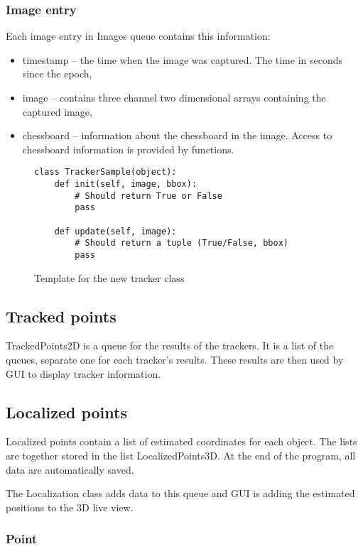 \subsubsection*{Image entry}

Each image entry in Images queue contains this information: 
\begin{itemize}
\item timestamp -- the time when the image was captured. The time in seconds
since the epoch, \item image -- contains three channel two dimensional arrays
containing the captured image, \item chessboard -- information about the
chessboard in the image. Access to chessboard information is provided by
functions. 
\end{itemize}

\begin{figure}
\begin{verbatim}
class TrackerSample(object):
    def init(self, image, bbox):
        # Should return True or False
        pass
    
    def update(self, image):
        # Should return a tuple (True/False, bbox)
        pass
\end{verbatim}
\caption{Template for the new tracker class}
\label{fig:new-tracker}
\end{figure}

\subsection*{Tracked points}

TrackedPoints2D is a queue for the results of the trackers. It is a list of the
queues, separate one for each tracker's results. These results are then used by
GUI to display tracker information.

\subsection*{Localized points}

Localized points contain a list of estimated coordinates for each object. The
lists are together stored in the list LocalizedPoints3D. At the end of the
program, all data are automatically saved.

The Localization class adds data to this queue and GUI is adding the estimated
positions to the 3D live view.

\subsubsection*{Point}

